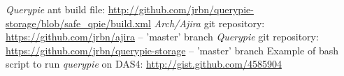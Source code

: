 \begin{thebibliography}{99}
		{\emph{Querypie} ant build file: \url{http://github.com/jrbn/querypie-storage/blob/safe_qpie/build.xml}}
		{\emph{Arch/Ajira} git repository: \url{https://github.com/jrbn/ajira} -- 'master' branch}
		{\emph{Querypie} git repository: \url{https://github.com/jrbn/querypie-storage} -- 'master' branch}
		{Example of bash script to run \emph{querypie} on DAS4: \url{http://gist.github.com/4585904}}
\end{thebibliography}
